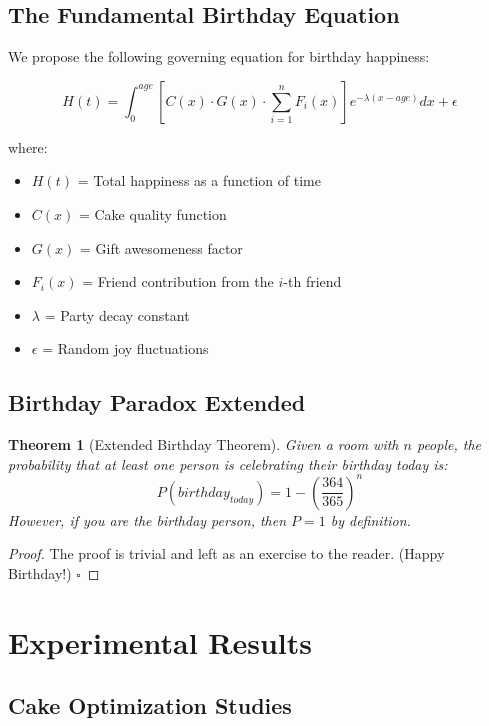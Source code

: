 \documentclass[12pt,a4paper]{article}
\newtheorem{theorem}{Theorem}
\begin{document}
\subsection{The Fundamental Birthday Equation}

We propose the following governing equation for birthday happiness:

\begin{equation}
H(t) = \int_0^{age} \left[ C(x) \cdot G(x) \cdot \sum_{i=1}^{n} F_i(x) \right] e^{-\lambda(x-age)} dx + \epsilon
\label{eq:happiness}
\end{equation}

where:
\begin{itemize}
    \item $H(t)$ = Total happiness as a function of time
    \item $C(x)$ = Cake quality function
    \item $G(x)$ = Gift awesomeness factor
    \item $F_i(x)$ = Friend contribution from the $i$-th friend
    \item $\lambda$ = Party decay constant
    \item $\epsilon$ = Random joy fluctuations
\end{itemize}

\subsection{Birthday Paradox Extended}

\begin{theorem}[Extended Birthday Theorem]
Given a room with $n$ people, the probability that at least one person is celebrating their birthday today is:
\begin{equation}
P(birthday_{today}) = 1 - \left(\frac{364}{365}\right)^n
\end{equation}
However, if you are the birthday person, then $P = 1$ by definition.
\end{theorem}

\begin{proof}
The proof is trivial and left as an exercise to the reader. (Happy Birthday!) $\square$
\end{proof}

\section{Experimental Results}

\subsection{Cake Optimization Studies}
\end{document}

